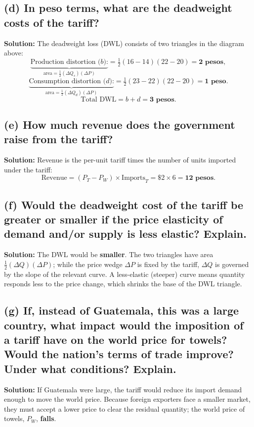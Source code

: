 \documentclass[11pt, letterpaper]{article}
\begin{document}
\subsection*{(d) In peso terms, what are the deadweight costs of the tariff?}
\noindent \textbf{Solution:} The deadweight loss (DWL) consists of two triangles in the diagram above:
\[
  \underbrace{\text{Production distortion ($b$):}}_{\text{area} = \tfrac{1}{2}(\Delta Q_s)(\Delta P)} = \tfrac{1}{2}(16-14)(22-20) = \mathbf{2 \text{ pesos}},
\]
\[
  \underbrace{\text{Consumption distortion ($d$):}}_{\text{area} = \tfrac{1}{2}(\Delta Q_d)(\Delta P)} = \tfrac{1}{2}(23-22)(22-20) = \mathbf{1 \text{ peso}}.
\]
\[
  \text{Total DWL} = b + d = \mathbf{3 \text{ pesos}}.
\]

\subsection*{(e) How much revenue does the government raise from the tariff?}
\noindent \textbf{Solution:} Revenue is the per-unit tariff times the number of units imported under the tariff:
\[
  \text{Revenue} = (P_T - P_W) \times \text{Imports}_T = \$2 \times 6 = \mathbf{12 \text{ pesos}}.
\]

\subsection*{(f) Would the deadweight cost of the tariff be greater or smaller if the price elasticity of demand and/or supply is less elastic? Explain.}
\noindent \textbf{Solution:} The DWL would be \textbf{smaller}. The two triangles have area $\tfrac{1}{2}(\Delta Q)(\Delta P)$; while the price wedge $\Delta P$ is fixed by the tariff, $\Delta Q$ is governed by the slope of the relevant curve. A less-elastic (steeper) curve means quantity responds less to the price change, which shrinks the base of the DWL triangle.

\subsection*{(g) If, instead of Guatemala, this was a large country, what impact would the imposition of a tariff have on the world price for towels? Would the nation's terms of trade improve? Under what conditions? Explain.}
\noindent \textbf{Solution:} If Guatemala were large, the tariff would reduce its import demand enough to move the world price. Because foreign exporters face a smaller market, they must accept a lower price to clear the residual quantity; the world price of towels, $P_W$, \textbf{falls}.
\end{document}
